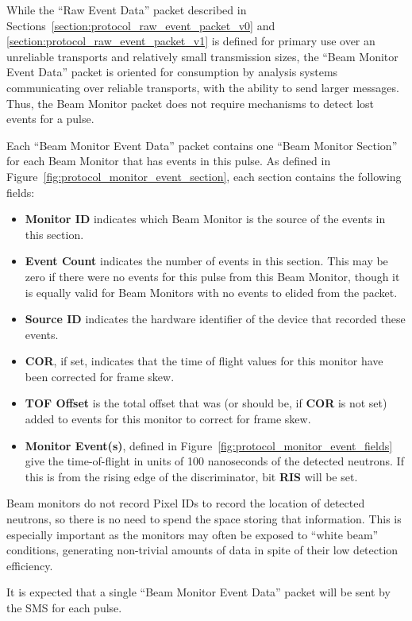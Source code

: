 While the ``Raw Event Data'' packet described in
Sections~\ref{section:protocol_raw_event_packet_v0}
and \ref{section:protocol_raw_event_packet_v1}
is defined for primary use over
an unreliable transports and relatively small transmission sizes, the ``Beam
Monitor Event Data'' packet is oriented for consumption by analysis systems
communicating over reliable transports, with the ability to send larger
messages. Thus, the Beam Monitor packet does not require mechanisms to detect
lost events for a pulse.

Each ``Beam Monitor Event Data'' packet contains one ``Beam Monitor Section''
for each Beam Monitor that has events in this pulse. As defined in
Figure~\ref{fig:protocol_monitor_event_section}, each section contains the
following fields:
\begin{itemize}
\item{\bf Monitor ID} indicates which Beam Monitor is the source of the events
in this section.
\item{\bf Event Count} indicates the number of events in this section. This
may be zero if there were no events for this pulse from this Beam Monitor,
though it is equally valid for Beam Monitors with no events to elided from
the packet.
\item{\bf Source ID} indicates the hardware identifier of the device that
recorded these events.
\item{\bf COR}, if set, indicates that the time of flight values for this
monitor have been corrected for frame skew.
\item{\bf TOF Offset} is the total offset that was (or should be, if {\bf COR}
is not set) added to events for this monitor to correct for frame skew.
\item{\bf Monitor Event(s)}, defined in
Figure~\ref{fig:protocol_monitor_event_fields} give the time-of-flight in units
of 100 nanoseconds of the detected neutrons. If this is from the rising edge
of the discriminator, bit {\bf RIS} will be set.
\end{itemize}

Beam monitors do not record Pixel IDs to record the location of detected
neutrons, so there is no need to spend the space storing that information.
This is especially important as the monitors may often be exposed to ``white
beam'' conditions, generating non-trivial amounts of data in spite of their
low detection efficiency.

It is expected that a single ``Beam Monitor Event Data'' packet will be sent
by the SMS for each pulse.


